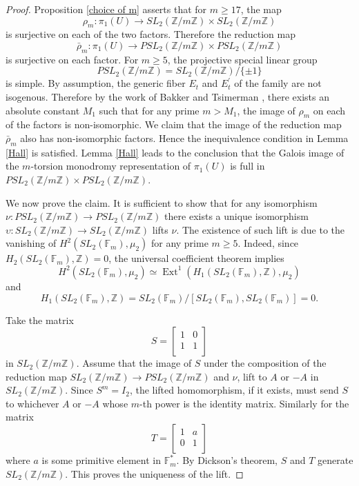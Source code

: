 \documentclass[12pt]{amsart}
\theoremstyle{definition}
\theoremstyle{remark}
\numberwithin{equation}{section}
\newcommand{\F}{\mathbb{F}}
\newcommand{\Z}{\mathbb{Z}}
\begin{document}
  \begin{proof} Proposition \ref{choice of m} asserts that for $m \ge 17$, the map
  $$\rho_{m}: \pi_{1}(U) \to SL_{2}(\Z/m\Z) \times SL_{2}(\Z/m\Z)$$
  is surjective on each of the two factors. Therefore the reduction map
  $$\bar{\rho}_{m}: \pi_{1}(U) \to PSL_{2}(\Z/m\Z) \times PSL_{2}(\Z/m\Z)$$
  is surjective on each factor. For $m \ge 5$, the projective special linear group $$PSL_{2}(\Z/m\Z)=SL_{2}(\Z/m\Z)/\{\pm 1\}$$ is simple. By assumption, the generic fiber $E_{t}$ and $E^{\prime}_{t}$ of the family are not isogenous. Therefore by the work of Bakker and Tsimerman \cite[Theorem 1]{BT}, there exists an absolute constant $M_1$ such that for any prime $m > M_{1}$, the image of $\rho_{m}$ on each of the factors is non-isomorphic. We claim that the image of the reduction map $\bar{\rho}_{m}$ also has non-isomorphic factors. Hence the inequivalence condition in Lemma \ref{Hall} is satisfied. Lemma \ref{Hall} leads to the conclusion that the Galois image of the $m$-torsion monodromy representation of $\pi_{1}(U)$ is full in $PSL_{2}(\Z/m\Z) \times PSL_{2}(\Z/m\Z)$.
  
  We now prove the claim. It is sufficient to show that for any isomorphism $\nu: PSL_2(\Z/m\Z) \to PSL_2(\Z/m\Z)$ there exists a unique isomorphism $ \upsilon: SL_2(\Z/m\Z) \to SL_2(\Z/m\Z)$ lifts $\nu$. The existence of such lift is due to the vanishing of $H^2(SL_2(\F_m), \mu_2)$ for any prime $m \ge 5.$ Indeed, since $H_2(SL_2(\F_m), \Z)=0$, the universal coefficient theorem implies $$H^2(SL_2(\F_m), \mu_2) \simeq \operatorname{Ext}^1(H_1(SL_2(\F_m),\Z), \mu_2)$$ and $$H_1(SL_2(\F_m),\Z)=SL_2(\F_m)/[SL_2(\F_m),SL_2(\F_m)]=0.$$
  
  Take the matrix \[
   S=
  \left[ {\begin{array}{cc}
   1 & 0 \\
   1 & 1 \\
  \end{array} } \right]
\]
in $SL_2(\Z/m\Z)$. Assume that the image of $S$ under the composition of the reduction map $SL_2(\Z/m\Z) \to PSL_2(\Z/m\Z)$ and $\nu$, lift to $A$ or $-A$ in $SL_2(\Z/m\Z)$. Since $S^m=I_2$, the lifted homomorphism, if it exists, must send $S$ to whichever $A$ or $-A$ whose $m$-th power is the identity matrix. Similarly for the matrix \[
   T=
  \left[ {\begin{array}{cc}
   1 & a \\
   0 & 1 \\
  \end{array} } \right]
\]
where $a$ is some primitive element in $\F_m^*$. By Dickson's theorem, $S$ and $T$ generate $SL_2(\Z/m\Z)$. This proves the uniqueness of the lift.
  \end{proof}
  
\end{document}

